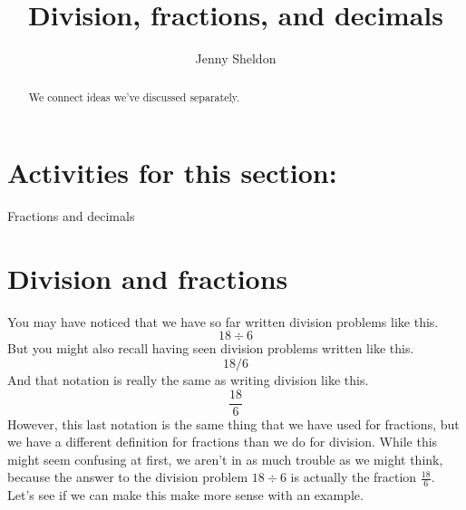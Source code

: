 \documentclass{ximera}
\title{Division, fractions, and decimals}
\author{Jenny Sheldon}
\begin{document}
\begin{abstract}
We connect ideas we've discussed separately.
\end{abstract}
\maketitle

\section{Activities for this section:} Fractions and decimals

\section{Division and fractions}

You may have noticed that we have so far written division problems like this.
\[
18 \div 6
\]
But you might also recall having seen division problems written like this.
\[
18 / 6
\]
And that notation is really the same as writing division like this.
\[
\frac{18}{6}
\]
However, this last notation is the same thing that we have used for fractions, but we have a different definition for fractions than we do for division. While this might seem confusing at first, we aren't in as much trouble as we might think, because the answer to the division problem $18 \div 6$ is actually the fraction $\frac{18}{6}$. Let's see if we can make this make more sense with an example.
\end{document}
